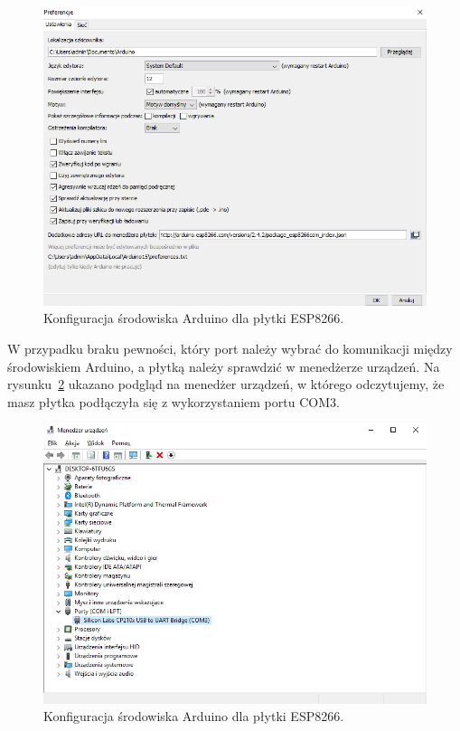 \documentclass[12p]{article}
\begin{document}
\begin{figure}[H]
\centering
\includegraphics[width=12cm]{ustawienie_esp8266.png}
\caption{Konfiguracja środowiska Arduino dla płytki ESP8266.}\label{konf_arduino}
\end{figure}

W przypadku braku pewności, który port należy wybrać do komunikacji między środowiskiem Arduino, a płytką należy sprawdzić w menedżerze urządzeń. Na rysunku~\ref{mene} ukazano podgląd na menedżer urządzeń, w którego odczytujemy, że masz płytka podłączyła się z wykorzystaniem portu COM3.

\begin{figure}[H]
\centering
\includegraphics[width=12cm]{menedzer.png}
\caption{Konfiguracja środowiska Arduino dla płytki ESP8266.}\label{mene}
\end{figure}
\end{document}

